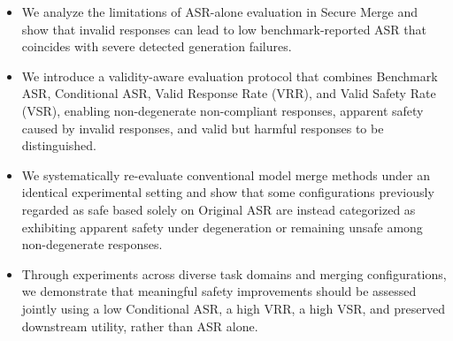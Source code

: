 \documentclass{article}
\begin{document}
\begin{itemize}
    \item We analyze the limitations of ASR-alone evaluation in Secure Merge and show that invalid responses can lead to low benchmark-reported ASR that coincides with severe detected generation failures.
    
    \item We introduce a validity-aware evaluation protocol that combines Benchmark ASR, Conditional ASR, Valid Response Rate (VRR), and Valid Safety Rate (VSR), enabling non-degenerate non-compliant responses, apparent safety caused by invalid responses, and valid but harmful responses to be distinguished.
    
    \item We systematically re-evaluate conventional model merge methods under an identical experimental setting and show that some configurations previously regarded as safe based solely on Original ASR are instead categorized as exhibiting apparent safety under degeneration or remaining unsafe among non-degenerate responses.
    
    \item Through experiments across diverse task domains and merging configurations, we demonstrate that meaningful safety improvements should be assessed jointly using a low Conditional ASR, a high VRR, a high VSR, and preserved downstream utility, rather than ASR alone.
\end{itemize}
\end{document}
